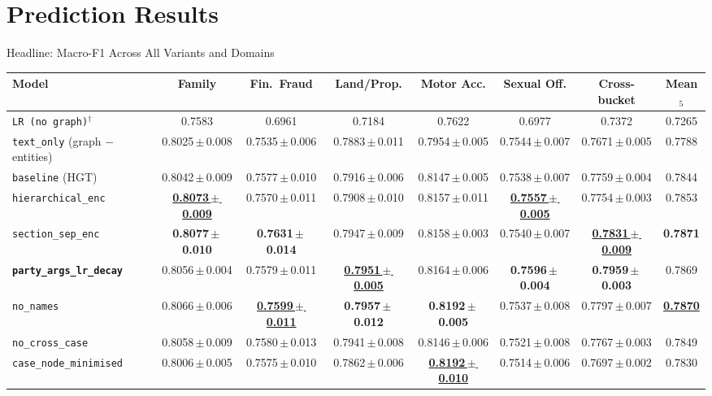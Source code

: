 \documentclass[aspectratio=169,11pt]{beamer}
\newcommand{\best}[1]{{\color{black}\textbf{#1}}}
\newcommand{\runnerup}[1]{{\color{black}\textbf{#1}}}
\begin{document}
\section{Prediction Results}

\begin{frame}{Headline: Macro-F1 Across All Variants and Domains}
  \tiny
  \centering
  \setlength{\tabcolsep}{3pt}
  \begin{adjustbox}{max width=\textwidth}
    \begin{tabular}{lccccccc}
      \toprule
      \textbf{Model} & \textbf{Family} & \textbf{Fin.\ Fraud} & \textbf{Land/Prop.} & \textbf{Motor Acc.} & \textbf{Sexual Off.} & \textbf{Cross-bucket} & \textbf{Mean$_5$} \\
      \midrule
      \texttt{LR (no graph)}$^\dagger$          & 0.7583               & 0.6961               & 0.7184               & 0.7622               & 0.6977               & 0.7372               & 0.7265 \\
      \texttt{text\_only} (graph $-$ entities)  & 0.8025\,$\pm$\,0.008 & 0.7535\,$\pm$\,0.006 & 0.7883\,$\pm$\,0.011 & 0.7954\,$\pm$\,0.005 & 0.7544\,$\pm$\,0.007 & 0.7671\,$\pm$\,0.005 & 0.7788 \\
      \texttt{baseline} (HGT)                   & 0.8042\,$\pm$\,0.009 & 0.7577\,$\pm$\,0.010 & 0.7916\,$\pm$\,0.006 & 0.8147\,$\pm$\,0.005 & 0.7538\,$\pm$\,0.007 & 0.7759\,$\pm$\,0.004 & 0.7844 \\
      \texttt{hierarchical\_enc}                & \runnerup{\underline{0.8073\,$\pm$\,0.009}} & 0.7570\,$\pm$\,0.011 & 0.7908\,$\pm$\,0.010 & 0.8157\,$\pm$\,0.011 & \runnerup{\underline{0.7557\,$\pm$\,0.005}} & 0.7754\,$\pm$\,0.003 & 0.7853 \\
      \texttt{section\_sep\_enc}                & \best{0.8077\,$\pm$\,0.010} & \best{0.7631\,$\pm$\,0.014} & 0.7947\,$\pm$\,0.009 & 0.8158\,$\pm$\,0.003 & 0.7540\,$\pm$\,0.007 & \runnerup{\underline{0.7831\,$\pm$\,0.009}} & \best{0.7871} \\
      \best{\texttt{party\_args\_lr\_decay}}    & 0.8056\,$\pm$\,0.004 & 0.7579\,$\pm$\,0.011 & \runnerup{\underline{0.7951\,$\pm$\,0.005}} & 0.8164\,$\pm$\,0.006 & \best{0.7596\,$\pm$\,0.004} & \best{0.7959\,$\pm$\,0.003} & 0.7869 \\
      \texttt{no\_names}                        & 0.8066\,$\pm$\,0.006 & \runnerup{\underline{0.7599\,$\pm$\,0.011}} & \best{0.7957\,$\pm$\,0.012} & \best{0.8192\,$\pm$\,0.005} & 0.7537\,$\pm$\,0.008 & 0.7797\,$\pm$\,0.007 & \runnerup{\underline{0.7870}} \\
      \texttt{no\_cross\_case}                  & 0.8058\,$\pm$\,0.009 & 0.7580\,$\pm$\,0.013 & 0.7941\,$\pm$\,0.008 & 0.8146\,$\pm$\,0.006 & 0.7521\,$\pm$\,0.008 & 0.7767\,$\pm$\,0.003 & 0.7849 \\
      \texttt{case\_node\_minimised}            & 0.8006\,$\pm$\,0.005 & 0.7575\,$\pm$\,0.010 & 0.7862\,$\pm$\,0.006 & \runnerup{\underline{0.8192\,$\pm$\,0.010}} & 0.7514\,$\pm$\,0.006 & 0.7697\,$\pm$\,0.002 & 0.7830 \\
      \bottomrule
    \end{tabular}
  \end{adjustbox}


\end{frame}
\end{document}
